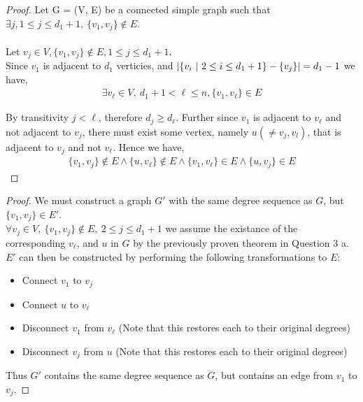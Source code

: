 \documentclass[12pt]{article}
\newenvironment{question}[2][Question]{\begin{trivlist}
\item[\hskip \labelsep {\bfseries #1}\hskip \labelsep {\bfseries #2.}]}{\end{trivlist}}
\DeclarePairedDelimiter\abs{\lvert}{\rvert}%
\begin{document}
\begin{question}{3 (a)}
  \leavevmode
  \begin{proof}
    Let G = (V, E) be a connected simple graph such that $\exists j, 1 \leq j \leq d_{1} + 1,\ \{v_{1}, v_{j}\} \notin E$. \\ \\
    Let $v_{j} \in V, \{v_{1}, v_{j}\} \notin E, 1 \leq j \leq d_{1} + 1$. \\
    Since $v_{1}$ is adjacent to $d_{1}$ verticies, and $\abs{\{v_{i}\ |\ 2 \leq i \leq d_{1} + 1\} - \{v_{j}\}} = d_{1} - 1$
    we have,
    \begin{align*}
      \exists v_{\ell} \in V,\ d_{1} + 1 < \ell \leq n, \{v_{1}, v_{\ell}\} \in E
    \end{align*}

    By transitivity $j < \ell$, therefore $d_{j} \geq d_{\ell}$.  Further since
    $v_{1}$ is adjacent to $v_{\ell}$ and not adjacent to $v_{j}$,
    there must exist some vertex, namely $u (\neq v_{j}, v_{l})$, that is adjacent to $v_{j}$ and not
    $v_{\ell}$. Hence we have,
    \begin{align*}
      \{v_{1}, v_{j}\} \notin E \land \{u, v_{\ell}\} \notin E \land
      \{v_{1}, v_{\ell}\} \in E \land \{u, v_{j}\} \in E
    \end{align*}
  \end{proof}
\end{question}

\begin{question}{3 (b)}
  \leavevmode 
  \begin{proof}
    We must construct a graph $G'$ with the same degree sequence as $G$, but
    $\{v_{1}, v_{j}\} \in E'$. \\

    $\forall v_{j} \in V,\ \{v_{1}, v_{j}\} \notin E,\ 2 \leq j \leq d_{1} + 1$
    we assume the existance of the corresponding $v_{\ell}$, and $u$ in $G$ by the previously
    proven theorem in Question 3 a. \\

    $E'$ can then be constructed by performing the following transformations to $E$:
    \begin{itemize}
      \item Connect $v_{1}$ to $v_{j}$
      \item Connect $u$ to $v_{\ell}$
      \item Disconnect $v_{1}$ from $v_{\ell}$ (Note that this restores each
        to their original degrees)
      \item Disconnect $v_{j}$ from $u$ (Note that this restores each to their
        original degrees)
    \end{itemize}
    Thus $G'$ contains the same degree sequence as $G$, but contains an edge
    from $v_{1}$ to $v_{j}$.
  \end{proof}
\end{question}
\end{document}
